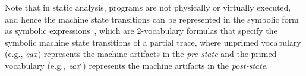 


Note that in static analysis, programs are not physically or virtually executed, and hence the machine state transitions can be represented in the symbolic form as %
symbolic expressions~\cite{DBLP:conf/sp/PewnyGGRH15,pewny2014leveraging}, which are 2-vocabulary formulas that specify the symbolic machine state transitions of a partial trace,
where unprimed vocabulary (e.g., $\emph{eax}$) represents the machine artifacts in the \emph{pre-state} and the primed vocabulary (e.g., $\emph{eax}^\prime$) represents the machine artifacts in the \emph{post-state}.

